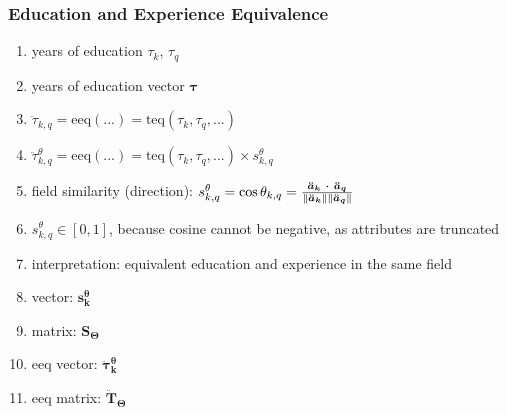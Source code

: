 \documentclass{elsarticle} %
\begin{document}
\subsubsection{Education and Experience Equivalence}
\begin{enumerate}
    \item years of education $\tau_k$, $\tau_q$
    \item years of education vector $\boldsymbol{\tau}$
    \item $\ddot{\tau}_{k,q} = \text{eeq}(...) = \text{teq}(\tau_k, \tau_q, ...)$
    \item $\ddot{\tau}_{k,q}^{\theta} = \text{eeq}(...) = \text{teq}(\tau_k, \tau_q, ...) \times s_{k,q}^{\theta}$
    \item field similarity (direction): $s_{k,q}^{\theta} = \cos\theta_{k,q} = \frac{
                  \boldsymbol{\ddot{a}_{k} \ \dotproduct\ \boldsymbol{\ddot{a}_{q}}} }{
                  \norm{\boldsymbol{\ddot{a}_{k}}} \norm{\boldsymbol{\ddot{a}_{q}}} } $
    \item $s_{k,q}^{\theta} \in [0,1]$, because cosine cannot be negative, as attributes are truncated
    \item interpretation: equivalent education and experience in the same field
    \item vector: $\boldsymbol{s_{k}^{\theta}}$
    \item matrix: $\textbf{S}_{\mathbf{\Theta}}$
    \item eeq vector: $\boldsymbol{\ddot{\tau}_{k}^{\theta}}$
    \item eeq matrix: $\boldsymbol{\ddot{\textbf{T}}_{\mathbf{\Theta}}}$
\end{enumerate}
\end{document}
